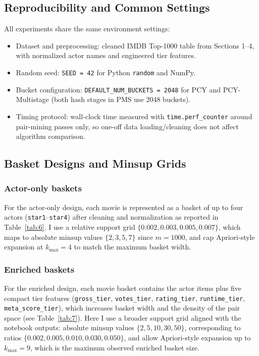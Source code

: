 \documentclass{article}  %
\begin{document}
\subsection{Reproducibility and Common Settings}

All experiments share the same environment settings:
\begin{itemize}
    \item Dataset and preprocessing: cleaned IMDB Top-1000 table from Sections 1--4, with normalized actor names and engineered tier features.
    \item Random seed: \verb|SEED = 42| for Python \verb|random| and NumPy.
    \item Bucket configuration: \verb|DEFAULT_NUM_BUCKETS = 2048| for PCY and PCY-Multistage (both hash stages in PMS use 2048 buckets).
    \item Timing protocol: wall-clock time measured with \verb|time.perf_counter| around pair-mining passes only, so one-off data loading/cleaning does not affect algorithm comparison.
\end{itemize}

\subsection{Basket Designs and Minsup Grids}

\subsubsection*{Actor-only baskets}
For the actor-only design, each movie is represented as a basket of up to four actors (\verb|star1|--\verb|star4|) after cleaning and normalization as reported in Table~\ref{tab:6}. I use a relative support grid \(\{0.002,\allowbreak 0.003,\allowbreak 0.005,\allowbreak 0.007\}\), which maps to absolute \(\mathrm{minsup}\) values \(\{2,\allowbreak 3,\allowbreak 5,\allowbreak 7\}\) since \(m = 1000\), and cap Apriori-style expansion at \(k_{\max} = 4\) to match the maximum basket width.

\subsubsection*{Enriched baskets}

For the enriched design, each movie basket contains the actor items plus five compact tier features (\verb|gross_tier|, \verb|votes_tier|, \verb|rating_tier|, \verb|runtime_tier|, \verb|meta_score_tier|), which increases basket width and the density of the pair space (see Table~\ref{tab:7}). Here I use a broader support grid aligned with the notebook outputs: absolute \(\mathrm{minsup}\)
 values \(\{2,\allowbreak 5,\allowbreak 10,\allowbreak 30,\allowbreak 50\}\), corresponding to ratios \(\{0.002,\allowbreak 0.005,\allowbreak 0.010,\allowbreak 0.030,\allowbreak 0.050\}\), and allow Apriori-style expansion up to \(k_{\max} = 9\), which is the maximum observed enriched basket size. 
\end{document}
